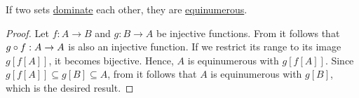 \begin{theorem}\label{thm:cantor_schroder_bernstein_theorem}
  If two sets \hyperref[def:equinumerosity]{dominate} each other, they are \hyperref[def:equinumerosity]{equinumerous}.
\end{theorem}
\begin{proof}
  Let \( f: A \to B \) and \( g: B \to A \) be injective functions. From  it follows that \( g \bincirc f: A \to A \) is also an injective function. If we restrict its range to its image \( g[f[A]] \), it becomes bijective. Hence, \( A \) is equinumerous with \( g[f[A]] \). Since \( g[f[A]] \subseteq g[B] \subseteq A \), from  it follows that \( A \) is equinumerous with \( g[B] \), which is the desired result.
\end{proof}

